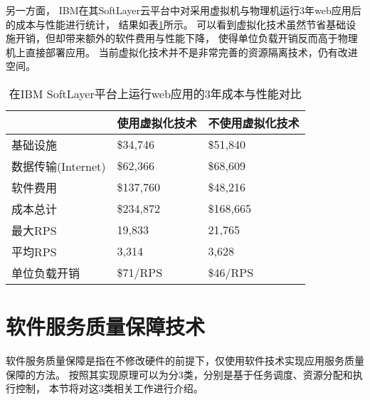 另一方面，
IBM在其SoftLayer云平台中对采用虚拟机与物理机运行3年web应用后的成本与性能进行统计\cite{Stadtmueller:2015}，
结果如表\ref{tab:ibm:vmm-eval}所示。
可以看到虚拟化技术虽然节省基础设施开销，但却带来额外的软件费用与性能下降，
使得单位负载开销反而高于物理机上直接部署应用。
当前虚拟化技术并不是非常完善的资源隔离技术，仍有改进空间。

\begin{table}[t]
  \centering
  \begin{minipage}[t]{0.8\linewidth}
  \caption[在IBM SoftLayer平台上运行web应用的3年成本与性能对比]{在IBM SoftLayer平台上运行web应用的3年成本与性能对比\cite{Stadtmueller:2015}}
  \label{tab:ibm:vmm-eval}
  \begin{tabular*}{\linewidth}{p{}<{\centering}p{}<{\raggedleft}p{}<{\raggedleft}}
    \toprule[1.5pt]
                       & \textbf{使用虚拟化技术} & \textbf{不使用虚拟化技术} \\
    \midrule[1pt]
    基础设施	       &                \$34,746 &                  \$51,840 \\
    数据传输(Internet) &                \$62,366 &                  \$68,609 \\
    软件费用	       &               \$137,760 &                  \$48,216 \\
    成本总计	       &               \$234,872 &                 \$168,665 \\
    最大RPS	       &                  19,833 &                    21,765 \\
    平均RPS	       &                   3,314 &                     3,628 \\
    单位负载开销       &                \$71/RPS &                  \$46/RPS \\
    \bottomrule[1.5pt]
  \end{tabular*}
  \end{minipage}
\end{table}

%
%
%

\section{软件服务质量保障技术}

软件服务质量保障是指在不修改硬件的前提下，仅使用软件技术实现应用服务质量保障的方法。
按照其实现原理可以为分3类，分别是基于任务调度、资源分配和执行控制，
本节将对这3类相关工作进行介绍。

